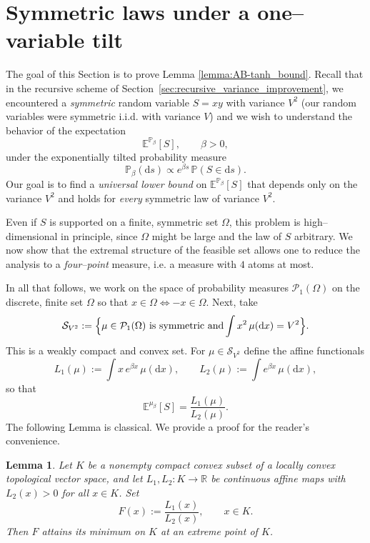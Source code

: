 \documentclass[reqno,11pt]{amsart}
\newcommand{\1}{\mathds{1}}
\theoremstyle{plain}
\newtheorem{lemma}[theorem]{Lemma}
\theoremstyle{definition}
\numberwithin{equation}{section}
\newcommand{\caP}{{\mathcal P}}
\newcommand{\bbP}{{\mathbb P}}
\begin{document}
\section{Symmetric laws under a one–variable tilt}
\label{sec:convex_geometry_proof}
The goal of this Section is to prove Lemma \ref{lemma:AB-tanh_bound}.
Recall that in the recursive scheme of Section~\ref{sec:recursive_variance_improvement},
we encountered a \emph{symmetric} random variable
$S = xy$ with variance $V^2$ (our random variables were symmetric i.i.d. with variance $V$)
and we wish to understand the behavior of the expectation
\[
    \mathbb{E}^{\bbP_\beta}[S],\qquad \beta>0,
\]
under the exponentially tilted probability measure
\begin{equation}\label{eq:S-tilt-law}
    \mathbb{P}_{\beta}(\mathrm{d}s)
    \propto 
    e^{\beta s}\,\mathbb{P}(S\in\mathrm{d}s).
\end{equation}
Our goal is to find a \emph{universal lower bound} on $\mathbb{E}^{\bbP_\beta}[S]$ 
that depends only on the variance $V^{2}$ and holds for \emph{every} symmetric law of variance $V^{2}$.

Even if $S$ is supported on a finite, symmetric set $\Omega$, this problem is high–dimensional in principle, since $\Omega$ might be large and the law of $S$ arbitrary.  
We now show that the extremal structure of the feasible set allows one to reduce the analysis to a \emph{four–point} measure, i.e. a measure with $4$ atoms at most. 

In all that follows, we work on the space of probability measures $\caP_1 (\Omega)$ on the discrete, finite set $\Omega$ so that $x \in \Omega \iff -x \in \Omega$. Next, take 
\[
    \mathcal{S}_{V^{2}}
    :=
    \Bigl\{
        \mu \in \caP_1 (\Omega) \text{  is symmetric and}
        \int x^{2}\,\mu(\mathrm{d}x) = V^{2}
    \Bigr\}.
\]
This is a weakly compact and convex set.
For $\mu\in\mathcal{S}_{V^{2}}$ define the affine functionals
\[
    L_{1}(\mu) := \int x\, e^{\beta x}\,\mu(\mathrm{d}x),\qquad
    L_{2}(\mu) := \int e^{\beta x}\,\mu(\mathrm{d}x),
\]
so that
\[
    \mathbb{E}^{\mu_\beta}[S]
    = \frac{L_{1}(\mu)}{L_{2}(\mu)}.
\]
The following Lemma is classical. We provide a proof for the reader's convenience.

\begin{lemma}\label{lem:ratio-extreme-attained}
Let $K$ be a nonempty compact convex subset of a locally convex topological
vector space, and let $L_1,L_2:K\to\mathbb{R}$ be continuous affine maps with
$L_2(x)>0$ for all $x\in K$. Set
\[
    F(x):=\frac{L_1(x)}{L_2(x)},\qquad x\in K.
\]
Then $F$ attains its minimum on $K$ at an extreme point of $K$.
\end{lemma}
\end{document}
